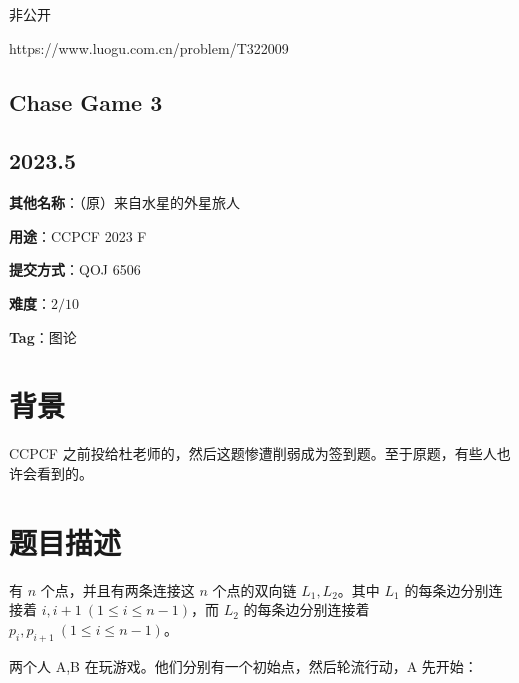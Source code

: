 \documentclass[a4paper,10pt]{article}
\begin{document}
非公开

https://www.luogu.com.cn/problem/T322009

\newpage

\vspace*{\fill}
\begin{center}

\section{Chase Game 3}

\subsection*{2023.5}

\vspace{10pt}

\textbf{其他名称}：（原）来自水星的外星旅人

\vspace{10pt}

\textbf{用途}：CCPCF 2023 F

\vspace{10pt}

\textbf{提交方式}：QOJ 6506

\vspace{10pt}

\textbf{难度}：$2/10$

\vspace{10pt}

\textbf{Tag}：图论

\end{center}
\vspace*{\fill}

\newpage

\section*{背景}

CCPCF 之前投给杜老师的，然后这题惨遭削弱成为签到题。至于原题，有些人也许会看到的。

\section*{题目描述}

有 $n$ 个点，并且有两条连接这 $n$ 个点的双向链 $L_1,L_2$。其中 $L_1$ 的每条边分别连接着 $i,i+1\ (1\leq i\leq n-1)$，而 $L_2$ 的每条边分别连接着 $p_i,p_{i+1}\ (1\leq i\leq n-1)$。

两个人 A,B 在玩游戏。他们分别有一个初始点，然后轮流行动，A 先开始：
\end{document}
